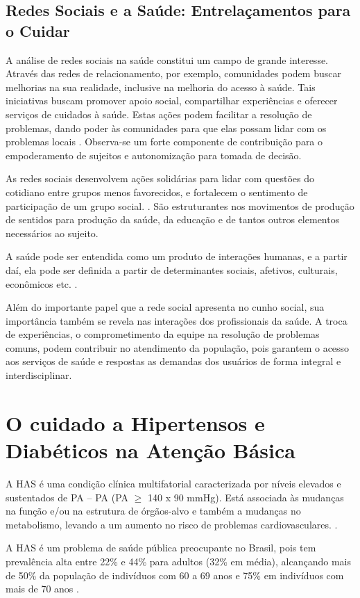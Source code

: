 \subsection{Redes Sociais e a Saúde: Entrelaçamentos para o Cuidar}
A análise de redes sociais na saúde constitui um campo de grande interesse. Através das redes de relacionamento, por exemplo, comunidades podem buscar melhorias na sua realidade, inclusive na melhoria do acesso à saúde. Tais iniciativas buscam promover apoio social, compartilhar experiências e oferecer serviços de cuidados à saúde. Estas ações podem facilitar a resolução de problemas, dando poder às comunidades para que elas possam lidar com os problemas locais \cite{maior2004formaccao}. Observa-se um forte componente de contribuição para o empoderamento de sujeitos e autonomização para tomada de decisão. 

As redes sociais desenvolvem ações solidárias para lidar com questões do cotidiano entre grupos menos favorecidos, e fortalecem o sentimento de participação de um grupo social. \cite{de2002apoio}. São estruturantes nos movimentos de produção de sentidos para produção da saúde, da educação e de tantos outros elementos necessários ao sujeito.

A saúde pode ser entendida como um produto de interações humanas, e a partir daí, ela pode ser definida a partir de determinantes sociais, afetivos, culturais, econômicos etc. \cite{martins2004redes}.

Além do importante papel que a rede social apresenta no cunho social, sua importância também se revela nas interações dos profissionais da saúde.  A troca de experiências, o comprometimento da equipe na resolução de problemas comuns, podem contribuir no atendimento da população, pois garantem o acesso aos serviços de saúde e respostas as demandas dos usuários de forma integral e interdisciplinar.

\section{O cuidado a Hipertensos e Diabéticos na Atenção Básica}
A \acrlong{HAS} é uma condição clínica multifatorial caracterizada por níveis elevados e sustentados de \acrlong{PA} – PA (PA $\geq$ 140 x 90 mmHg). Está associada às mudanças na função e/ou na estrutura de órgãos-alvo e também a mudanças no metabolismo, levando a um aumento no risco de problemas cardiovasculares. \cite{hipertenso}.

A HAS é um problema de saúde pública preocupante no Brasil, pois tem prevalência alta entre 22\% e 44\% para adultos (32\% em média), alcançando mais de 50\% da população de indivíduos com 60 a 69 anos e 75\% em indivíduos com mais de 70 anos \cite{hipertenso}.

